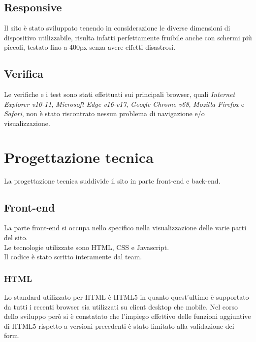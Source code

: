 \subsection{Responsive}

Il sito è stato sviluppato tenendo in considerazione le diverse dimensioni di dispositivo utilizzabile, risulta infatti perfettamente fruibile anche con schermi più piccoli, testato fino a 400px senza avere effetti disastrosi.

\subsection{Verifica}
Le verifiche e i test sono stati effettuati sui principali browser, quali \textit{Internet Explorer v10-11}, \textit{Microsoft Edge v16-v17},  \textit{Google Chrome v68},
\textit{Mozilla Firefox} e \textit{Safari}, non è stato riscontrato nessun problema di navigazione e/o visualizzazione.
\section{Progettazione tecnica}
La progettazione tecnica suddivide il sito in parte front-end e back-end.
\subsection{Front-end}

La parte front-end si occupa nello specifico nella visualizzazione delle varie parti del sito.\\
Le tecnologie utilizzate sono HTML, CSS e Javascript.\\
Il codice è stato scritto interamente dal team.

\subsubsection{HTML}

Lo standard utilizzato per HTML è HTML5 in quanto quest’ultimo è supportato da tutti i recenti browser sia utilizzati su client desktop che mobile. 
Nel corso dello sviluppo però si è constatato che l’impiego effettivo delle funzioni aggiuntive di HTML5 rispetto a versioni precedenti è stato limitato alla validazione dei form.

